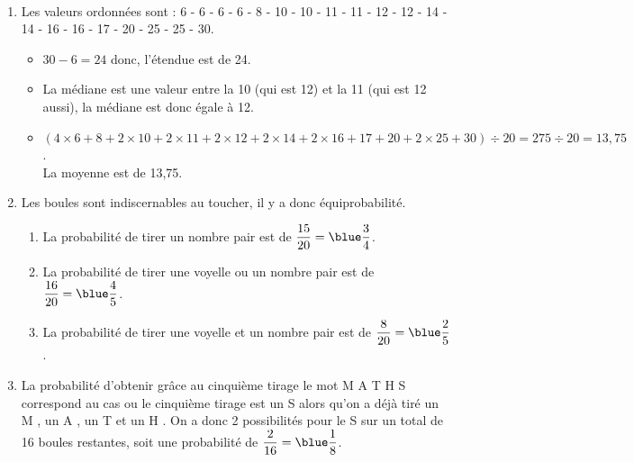 \begin{corrige}
\ \\ [-5mm]
   \begin{enumerate}
      \item Les valeurs ordonnées sont : 6 - 6 - 6 - 6 - 8 - 10 - 10 - 11 - 11 - 12 - 12 - 14 - 14 - 16 - 16 - 17 - 20 - 25 - 25 - 30.
         \begin{itemize}
            \item $30-6 =24$ donc, {\blue l'étendue est de 24}.
            \item La médiane est une valeur entre la 10 (qui est 12) et la 11 (qui est 12 aussi), {\blue la médiane est donc égale à 12}.
            \item $(4\times6+8+2\times10+2\times11+2\times12+2\times14+2\times16+17+20+2\times25+30)\div20 =275\div20 =13,75$. \\
               {\blue La moyenne est de 13,75}.
         \end{itemize}
      \item Les boules sont indiscernables au toucher, il y a donc équiprobabilité. \\ [1mm]
         \begin{enumerate}
            \item {\blue La probabilité de \og tirer un nombre pair \fg{} est de} $\dfrac{15}{20} ={\blue \dfrac34}$.
            \item {\blue La probabilité de \og tirer une voyelle ou un nombre pair \fg{} est de} $\dfrac{16}{20} ={\blue \dfrac45}$. \smallskip
            \item {\blue La probabilité de \og tirer une voyelle et un nombre pair \fg{} est de} $\dfrac{8}{20} ={\blue \dfrac25}$. \smallskip
         \end{enumerate}
      \setcounter{enumi}{2}
      \item La probabilité d’obtenir grâce au cinquième tirage le mot \og M A T H S \fg{} correspond au cas ou le cinquième tirage est un \og S \fg{} alors qu'on a déjà tiré un \og M \fg, un \og A \fg, un \og T \fg{} et un \og H \fg. On a donc 2 possibilités pour le \og S \fg{} sur un total de 16 boules restantes, soit une probabilité de $\dfrac{2}{16} ={\blue \dfrac18}$.
   \end{enumerate}

\end{corrige}

\bigskip


